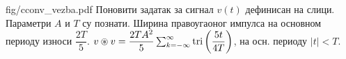\begin{slikaDesno}{fig/cconv_vezba.pdf}
    \PID 
    Поновити задатак  за сигнал $v(t)$ дефинисан на слици. 
    Параметри $A$ и $T$ су познати. Ширина правоугаоног импулса на 
    основном периоду износи $\dfrac{2T}{5}$.
    \REZULTAT 
    $v \circledast v = \dfrac{2TA^2}{5}\sum_{k=-\infty}^{\infty} 
    {\rm tri}\left( 
    \dfrac{5t}{4T}
    \right)$, на осн. периоду $|t| < T$.
\end{slikaDesno} \\
\vspace*{2mm}

